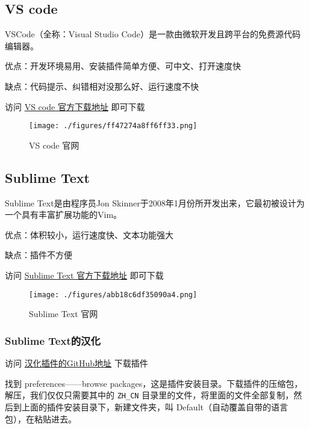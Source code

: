 
\begin{issues}
\issueTODO
\end{issues}

\subsection{VS code}

VSCode（全称：Visual Studio Code）是一款由微软开发且跨平台的免费源代码编辑器。

优点：开发环境易用、安装插件简单方便、可中文、打开速度快

缺点：代码提示、纠错相对没那么好、运行速度不快

访问 \href{https://code.visualstudio.com/}{VS code 官方下载地址} 即可下载

\begin{figure}[ht]
\centering
\texttt{[image: ./figures/ff47274a8ff6ff33.png]}
\caption{VS code 官网} \label{fig_Code_1}
\end{figure}

\subsection{Sublime Text}

Sublime Text是由程序员Jon Skinner于2008年1月份所开发出来，它最初被设计为一个具有丰富扩展功能的Vim。

优点：体积较小，运行速度快、文本功能强大

缺点：插件不方便

访问 \href{https://www.sublimetext.com/}{Sublime Text 官方下载地址} 即可下载

\begin{figure}[ht]
\centering
\texttt{[image: ./figures/abb18c6df35090a4.png]}
\caption{Sublime Text 官网} \label{fig_Code_2}
\end{figure}

\subsubsection{Sublime Text的汉化}

访问 \href{https://github.com/rexdf/ChineseLocalization}{汉化插件的GitHub地址} 下载插件

找到 preferences——browse packages，这是插件安装目录。下载插件的压缩包，解压，我们仅仅只需要其中的 \verb|ZH_CN| 目录里的文件，将里面的文件全部复制，然后到上面的插件安装目录下，新建文件夹，叫 Default（自动覆盖自带的语言包），在粘贴进去。



